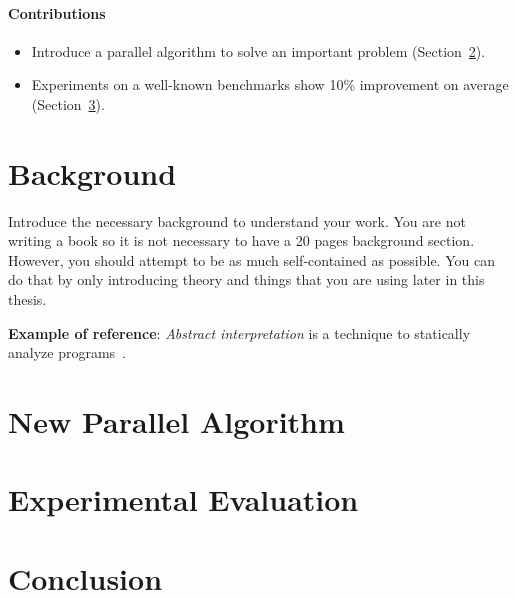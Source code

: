 \documentclass[10pt,a4paper]{article}
\begin{document}
\paragraph{Contributions}
\begin{itemize}
  \item Introduce a parallel algorithm to solve an important problem (Section~\ref{new-algo}).
  \item Experiments on a well-known benchmarks show 10\% improvement on average (Section~\ref{experiments}).
\end{itemize}

\section{Background}

Introduce the necessary background to understand your work. You are not writing a book so it is not necessary to have a 20 pages background section. However, you should attempt to be as much self-contained as possible. You can do that by only introducing theory and things that you are using later in this thesis.

\textbf{Example of reference}: \textit{Abstract interpretation} is a technique to statically analyze programs~\cite{cousot-abstract-1977}.

\section{New Parallel Algorithm}
\label{new-algo}

\section{Experimental Evaluation}
\label{experiments}

\section{Conclusion}

\newpage


\end{document}

